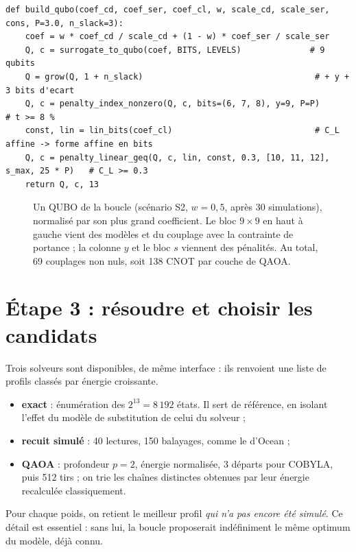 \begin{codebox}
\begin{lstlisting}
def build_qubo(coef_cd, coef_ser, coef_cl, w, scale_cd, scale_ser, cons, P=3.0, n_slack=3):
    coef = w * coef_cd / scale_cd + (1 - w) * coef_ser / scale_ser
    Q, c = surrogate_to_qubo(coef, BITS, LEVELS)              # 9 qubits
    Q = grow(Q, 1 + n_slack)                                   # + y + 3 bits d'ecart
    Q, c = penalty_index_nonzero(Q, c, bits=(6, 7, 8), y=9, P=P)          # t >= 8 %
    const, lin = lin_bits(coef_cl)                             # C_L affine -> forme affine en bits
    Q, c = penalty_linear_geq(Q, c, lin, const, 0.3, [10, 11, 12], s_max, 25 * P)   # C_L >= 0.3
    return Q, c, 13
\end{lstlisting}
\end{codebox}

\begin{figure}[htbp]
\centering

\caption{Un QUBO de la boucle (scénario S2, $w=0{,}5$, après 30 simulations), normalisé par son plus grand coefficient. Le bloc $9\times9$ en haut à gauche vient des modèles et du couplage avec la contrainte de portance ; la colonne $y$ et le bloc $s$ viennent des pénalités. Au total, 69 couplages non nuls, soit 138 CNOT par couche de QAOA.}\label{fig:matQ}
\end{figure}

\section{Étape 3 : résoudre et choisir les candidats}
Trois solveurs sont disponibles, de même interface : ils renvoient une liste de profils classés par énergie croissante.
\begin{itemize}
\item \textbf{exact} : énumération des $2^{13}=8\,192$ états. Il sert de référence, en isolant l'effet du modèle de substitution de celui du solveur ;
\item \textbf{recuit simulé} : 40 lectures, 150 balayages, comme le  d'Ocean ;
\item \textbf{QAOA} : profondeur $p=2$, énergie normalisée, 3 départs pour COBYLA, puis 512 tirs ; on trie les chaînes distinctes obtenues par leur énergie recalculée classiquement.
\end{itemize}
Pour chaque poids, on retient le meilleur profil \emph{qui n'a pas encore été simulé}. Ce détail est essentiel : sans lui, la boucle proposerait indéfiniment le même optimum du modèle, déjà connu.

